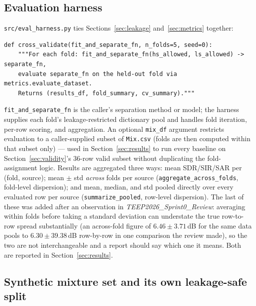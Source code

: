 \documentclass[11pt]{article}
\begin{document}
\subsection{Evaluation harness}
\label{sec:harness}

\texttt{src/eval\_harness.py} ties Sections~\ref{sec:leakage}
and~\ref{sec:metrics} together:

\begin{lstlisting}
def cross_validate(fit_and_separate_fn, n_folds=5, seed=0):
    """For each fold: fit_and_separate_fn(hs_allowed, ls_allowed) -> separate_fn,
    evaluate separate_fn on the held-out fold via metrics.evaluate_dataset.
    Returns (results_df, fold_summary, cv_summary)."""
\end{lstlisting}

\texttt{fit\_and\_separate\_fn} is the caller's separation method or model;
the harness supplies each fold's leakage-restricted dictionary pool and
handles fold iteration, per-row scoring, and aggregation. An optional
\texttt{mix\_df} argument restricts evaluation to a caller-supplied subset
of \texttt{Mix.csv} (folds are then computed within that subset only) ---
used in Section~\ref{sec:results} to run every baseline on
Section~\ref{sec:validity}'s 36-row valid subset without duplicating the
fold-assignment logic. Results are aggregated three ways: mean SDR/SIR/SAR
per (fold, source); mean $\pm$ std \emph{across} folds per source
(\texttt{aggregate\_across\_folds}, fold-level dispersion); and mean,
median, and std pooled directly over every evaluated row per source
(\texttt{summarize\_pooled}, row-level dispersion). The last of these was
added after an observation in \emph{TEEP2026\_Sprint0\_Review}: averaging
within folds before taking a standard deviation can understate the true
row-to-row spread substantially (an across-fold figure of
$6.46\pm3.71$\,dB for the same data pools to $6.30\pm39.38$\,dB
row-by-row in one comparison the review made), so the two are not
interchangeable and a report should say which one it means. Both are
reported in Section~\ref{sec:results}.

\subsection{Synthetic mixture set and its own leakage-safe split}
\label{sec:synthetic}
\end{document}
